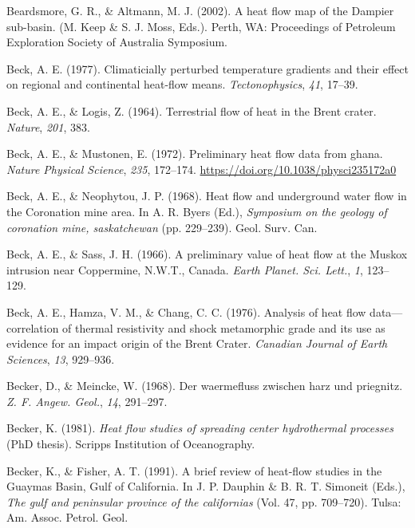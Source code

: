 \documentclass[draft,linenumbers]{agujournal2018}
\begin{document}
\leavevmode{}%
Beardsmore, G. R., \& Altmann, M. J. (2002). A heat flow map of the
{Dampier} sub-basin. (M. Keep \& S. J. Moss, Eds.). Perth, WA:
Proceedings of Petroleum Exploration Society of Australia Symposium.

\leavevmode{}%
Beck, A. E. (1977). Climaticially perturbed temperature gradients and
their effect on regional and continental heat-flow means.
\emph{Tectonophysics}, \emph{41}, 17--39.

\leavevmode{}%
Beck, A. E., \& Logis, Z. (1964). Terrestrial flow of heat in the
{Brent} crater. \emph{Nature}, \emph{201}, 383.

\leavevmode{}%
Beck, A. E., \& Mustonen, E. (1972). Preliminary heat flow data from
ghana. \emph{Nature Physical Science}, \emph{235}, 172--174.
\url{https://doi.org/10.1038/physci235172a0}

\leavevmode{}%
Beck, A. E., \& Neophytou, J. P. (1968). Heat flow and underground water
flow in the {Coronation} mine area. In A. R. Byers (Ed.),
\emph{Symposium on the geology of coronation mine, saskatchewan} (pp.
229--239). Geol. Surv. Can.

\leavevmode{}%
Beck, A. E., \& Sass, J. H. (1966). A preliminary value of heat flow at
the {Muskox} intrusion near {Coppermine, N.W.T., Canada}. \emph{Earth
Planet. Sci. Lett.}, \emph{1}, 123--129.

\leavevmode{}%
Beck, A. E., Hamza, V. M., \& Chang, C. C. (1976). Analysis of heat flow
data---correlation of thermal resistivity and shock metamorphic grade
and its use as evidence for an impact origin of the {Brent Crater}.
\emph{Canadian Journal of Earth Sciences}, \emph{13}, 929--936.

\leavevmode{}%
Becker, D., \& Meincke, W. (1968). Der waermefluss zwischen harz und
priegnitz. \emph{Z. F. Angew. Geol.}, \emph{14}, 291--297.

\leavevmode{}%
Becker, K. (1981). \emph{Heat flow studies of spreading center
hydrothermal processes} (PhD thesis). Scripps Institution of
Oceanography.

\leavevmode{}%
Becker, K., \& Fisher, A. T. (1991). A brief review of heat-flow studies
in the {Guaymas Basin, Gulf of California}. In J. P. Dauphin \& B. R. T.
Simoneit (Eds.), \emph{The gulf and peninsular province of the
californias} (Vol. 47, pp. 709--720). Tulsa: Am. Assoc. Petrol. Geol.
\end{document}
